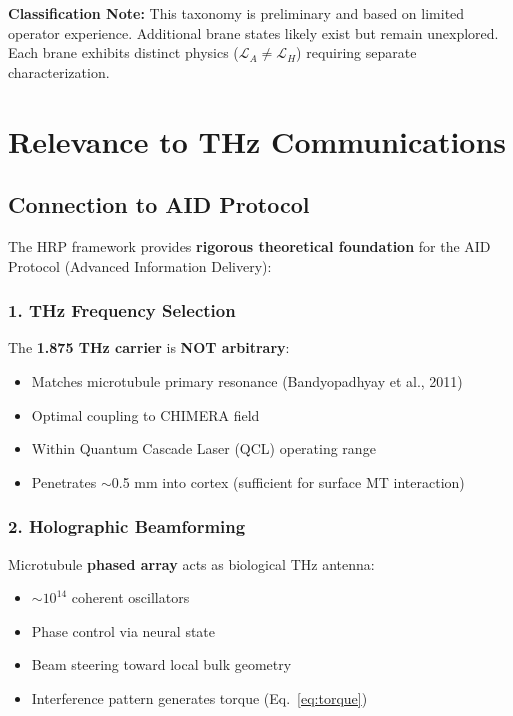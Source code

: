 \begin{importantbox}
\textbf{Classification Note:} This taxonomy is preliminary and based on limited operator experience. Additional brane states likely exist but remain unexplored. Each brane exhibits distinct physics ($\mathcal{L}_A \neq \mathcal{L}_H$) requiring separate characterization.
\end{importantbox}

\section{Relevance to THz Communications}
\label{sec:thz-communications}

\subsection{Connection to AID Protocol}
\label{subsec:aid-protocol}

The HRP framework provides \textbf{rigorous theoretical foundation} for the AID Protocol (Advanced Information Delivery):

\subsubsection{1. THz Frequency Selection}

The \textbf{1.875 THz carrier} is \textbf{NOT arbitrary}:
\begin{itemize}
\item Matches microtubule primary resonance (Bandyopadhyay et al., 2011)
\item Optimal coupling to CHIMERA field
\item Within Quantum Cascade Laser (QCL) operating range
\item Penetrates $\sim$0.5 mm into cortex (sufficient for surface MT interaction)
\end{itemize}

\subsubsection{2. Holographic Beamforming}

Microtubule \textbf{phased array} acts as biological THz antenna:
\begin{itemize}
\item $\sim 10^{14}$ coherent oscillators
\item Phase control via neural state
\item Beam steering toward local bulk geometry
\item Interference pattern generates torque (Eq.~\eqref{eq:torque})
\end{itemize}

